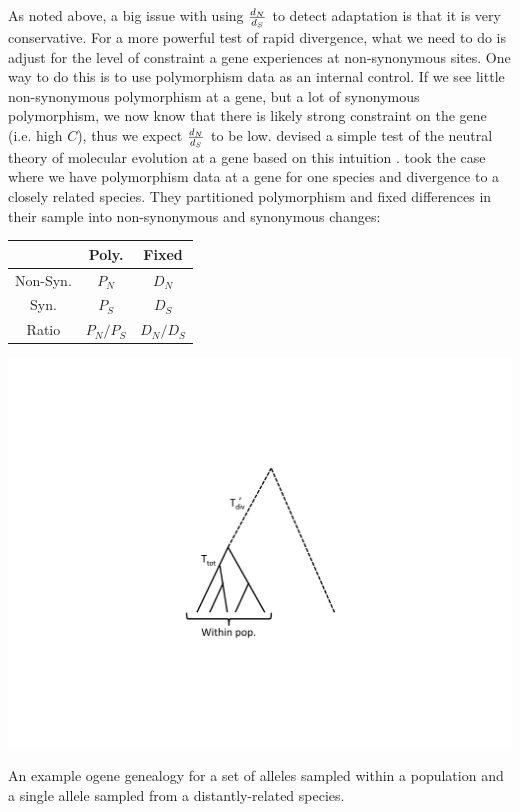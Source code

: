 As noted above, a big issue with using $\frac{d_N}{d_S}$ to detect adaptation is that it is very conservative. For a more powerful test of rapid divergence, what we need to do is adjust for the level of constraint a gene experiences at non-synonymous sites. One way to do this is to use polymorphism data as an internal control. If we see little non-synonymous polymorphism at a gene, but a  lot of synonymous polymorphism, we now know that there is likely strong constraint on the gene (i.e. high $C$), thus we expect $\frac{d_N}{d_S}$ to be low. \citet{mcdonald:91} devised a simple test of the neutral theory of molecular evolution at a gene based on this intuition \citep[building on the conceptually similar HKA
test][]{hudson1987test}. \citeauthor{mcdonald:91} took the case where we have polymorphism data at a gene for one species and divergence to a closely related species. They  partitioned polymorphism and fixed differences in their sample into 
non-synonymous and synonymous changes:

\begin{center}
\begin{tabular}{ccc}
 & Poly. & Fixed \\
\hline 
Non-Syn. &    $P_N$  &   $D_N$  \\
Syn. &    $P_S$   &     $D_S$   \\
Ratio & $P_N/P_S$ & $D_N/D_S$
\end{tabular}
\end{center}

\begin{marginfigure}
\begin{center}
\includegraphics[width= \textwidth]{figures/Coalescent/MK_tree.pdf}
\end{center}
\caption{An example ogene genealogy for a set of alleles sampled within a population and a single allele sampled from a distantly-related species.} \label{fig:MK_tree}
\end{marginfigure}


